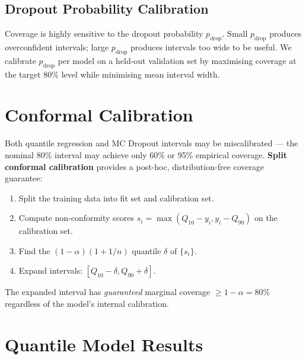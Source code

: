 \documentclass[12pt,a4paper]{report}
\begin{document}
\subsection{Dropout Probability Calibration}

Coverage is highly sensitive to the dropout probability $p_\text{drop}$. Small $p_\text{drop}$ produces overconfident intervals; large $p_\text{drop}$ produces intervals too wide to be useful. We calibrate $p_\text{drop}$ per model on a held-out validation set by maximising coverage at the target 80\% level while minimising mean interval width.

\section{Conformal Calibration}

Both quantile regression and MC Dropout intervals may be miscalibrated — the nominal 80\% interval may achieve only 60\% or 95\% empirical coverage. \textbf{Split conformal calibration} \cite{angelopoulos2021gentle} provides a post-hoc, distribution-free coverage guarantee:

\begin{enumerate}[leftmargin=1.5cm]
  \item Split the training data into fit set and calibration set.
  \item Compute non-conformity scores $s_i = \max(Q_{10} - y_i, y_i - Q_{90})$ on the calibration set.
  \item Find the $(1-\alpha)(1 + 1/n)$ quantile $\delta$ of $\{s_i\}$.
  \item Expand intervals: $[Q_{10} - \delta, Q_{90} + \delta]$.
\end{enumerate}

The expanded interval has \textit{guaranteed} marginal coverage $\geq 1 - \alpha = 80\%$ regardless of the model's internal calibration.

\section{Quantile Model Results}
\end{document}
